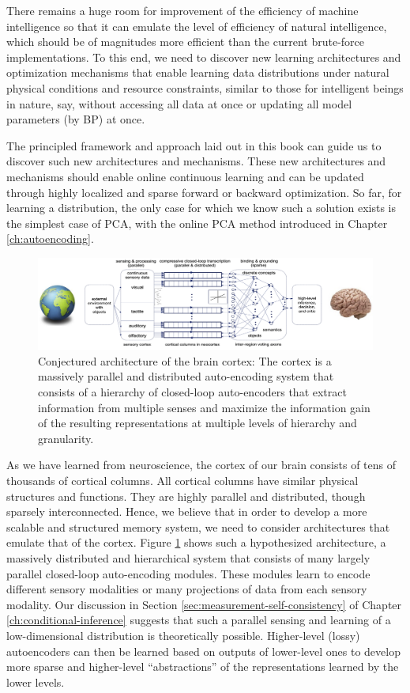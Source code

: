 \documentclass[../../book-main.tex]{subfiles}
\begin{document}
There remains a huge room for  improvement of the efficiency of   machine intelligence so that it can emulate the level of efficiency of natural intelligence, which should be of magnitudes more efficient than the current brute-force implementations. To this end, we need to discover new learning architectures and optimization mechanisms that enable learning data distributions under natural physical conditions and resource constraints, similar to those for intelligent beings in nature, say, without accessing all data at once or updating all model parameters (by BP) at once. 

The principled framework and approach laid out in this book can guide us to discover such new architectures and mechanisms.  These new architectures and mechanisms should enable online continuous learning and can be updated through highly localized and sparse forward or backward optimization. So far, for learning a distribution, the only case for which we know such a solution exists is the simplest case of PCA, with the online PCA method introduced in Chapter \ref{ch:autoencoding}.  

\begin{figure}[t]
\centering
\includegraphics[width=0.99\linewidth]{chapters/chapter8/figs/loops.png}
    \caption{Conjectured architecture of the brain cortex: The cortex is a massively parallel and distributed auto-encoding system that consists of a hierarchy of closed-loop auto-encoders that extract information from multiple senses and maximize the information  gain of the resulting representations at multiple levels of hierarchy and granularity.}
    \label{fig:loops}
\end{figure}
As we have learned from neuroscience, the cortex of our brain consists of tens of thousands of cortical columns. All cortical columns have similar physical structures and functions. They are highly parallel and distributed, though sparsely interconnected. Hence, we believe that in order to develop a more scalable and structured memory system, we need to consider architectures that emulate that of the cortex. Figure \ref{fig:loops} shows such a hypothesized architecture, a massively distributed and hierarchical system that consists of many largely parallel closed-loop auto-encoding modules. These modules learn to encode different sensory modalities or many projections of data from each sensory modality. Our discussion in Section \ref{sec:measurement-self-consistency} of Chapter \ref{ch:conditional-inference} suggests that such a parallel sensing and learning of a low-dimensional distribution is theoretically possible. Higher-level (lossy) autoencoders can then be learned based on outputs of lower-level ones to develop more sparse and higher-level  ``abstractions'' of the representations learned by the lower levels. 
\end{document}
